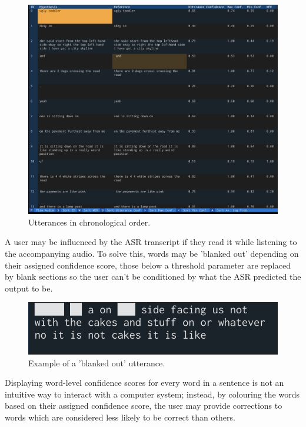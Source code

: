 \begin{figure}[h]
  \centering
  \includegraphics[width=\textwidth]{images/chronological-order.png}
  \caption{Utterances in chronological order.}
  \label{fig:sys-chronological}
\end{figure}

A user may be influenced by the ASR transcript if they read it while listening to the accompanying audio.
To solve this, words may be 'blanked out' depending on their assigned confidence score, those below a threshold parameter are replaced by blank sections so the user can't be conditioned by what the ASR predicted the output to be.

\begin{figure}[h]
  \centering
  \includegraphics[width=\textwidth]{images/text-blanking.png}
  \caption{Example of a 'blanked out' utterance.}
  \label{fig:sys-blanking}
\end{figure}

Displaying word-level confidence scores for every word in a sentence is not an intuitive way to interact with a computer system; instead, by colouring the words based on their assigned confidence score, the user may provide corrections to words which are considered less likely to be correct than others.

